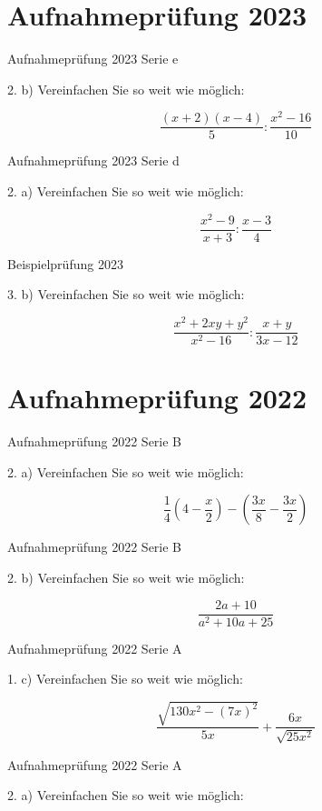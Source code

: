 {\section*{Aufnahmeprüfung 2023}
Aufnahmeprüfung 2023 Serie e

2. b) Vereinfachen Sie so weit wie möglich:

$$\frac{(x+2)(x-4)}{5} : \frac{x^2 - 16}{10}$$

Aufnahmeprüfung 2023 Serie d

2. a) Vereinfachen Sie so weit wie möglich:

$$\frac{x^2-9}{x+3} : \frac{x-3}{4}$$

Beispielprüfung 2023

3. b) Vereinfachen Sie so weit wie möglich:

$$\frac{x^2+2xy+y^2}{x^2-16} : \frac{x+y}{3x-12}$$

\section*{Aufnahmeprüfung 2022}
Aufnahmeprüfung 2022 Serie B

2. a) Vereinfachen Sie so weit wie möglich:

$$\frac14 \left(4-\frac{x}2 \right) - \left( \frac{3x}{8} - \frac{3x}{2}\right)$$

Aufnahmeprüfung 2022 Serie B

2. b) Vereinfachen Sie so weit wie möglich:

$$\frac{2a+10}{a^2+10a+25}$$

Aufnahmeprüfung 2022 Serie A

1. c) Vereinfachen Sie so weit wie möglich:

$$\frac{\sqrt{130x^2-(7x)^2}}{5x} + \frac{6x}{\sqrt{25x^2}}$$

Aufnahmeprüfung 2022 Serie A

2. a) Vereinfachen Sie so weit wie möglich:

}
